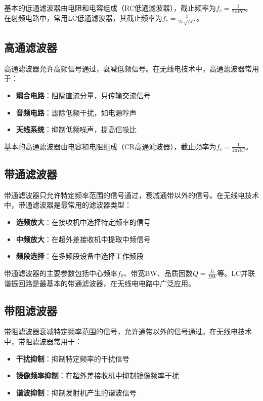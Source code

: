 \documentclass[12pt,UTF8]{ctexbook}
\begin{document}
基本的低通滤波器由电阻和电容组成（RC低通滤波器），截止频率为$f_c = \frac{1}{2\pi RC}$。在射频电路中，常用LC低通滤波器，其截止频率为$f_c = \frac{1}{2\pi\sqrt{LC}}$。

\subsection{高通滤波器}

高通滤波器允许高频信号通过，衰减低频信号。在无线电技术中，高通滤波器常用于：

\begin{itemize}[leftmargin=3.5em]
    \item \textbf{耦合电路}：阻隔直流分量，只传输交流信号
    \item \textbf{音频电路}：滤除低频干扰，如电源哼声
    \item \textbf{天线系统}：抑制低频噪声，提高信噪比
\end{itemize}

基本的高通滤波器由电容和电阻组成（CR高通滤波器），截止频率为$f_c = \frac{1}{2\pi RC}$。

\subsection{带通滤波器}

带通滤波器只允许特定频率范围的信号通过，衰减通带以外的信号。在无线电技术中，带通滤波器是最常用的滤波器类型：

\begin{itemize}[leftmargin=3.5em]
    \item \textbf{选频放大}：在接收机中选择特定频率的信号
    \item \textbf{中频放大}：在超外差接收机中提取中频信号
    \item \textbf{频段选择}：在多频段设备中选择工作频段
\end{itemize}

带通滤波器的主要参数包括中心频率$f_0$、带宽BW、品质因数$Q = \frac{f_0}{BW}$等。LC并联谐振回路是最基本的带通滤波器，在无线电电路中广泛应用。

\subsection{带阻滤波器}

带阻滤波器衰减特定频率范围的信号，允许通带以外的信号通过。在无线电技术中，带阻滤波器常用于：

\begin{itemize}[leftmargin=3.5em]
    \item \textbf{干扰抑制}：抑制特定频率的干扰信号
    \item \textbf{镜像频率抑制}：在超外差接收机中抑制镜像频率干扰
    \item \textbf{谐波抑制}：抑制发射机产生的谐波信号
\end{itemize}
\end{document}
